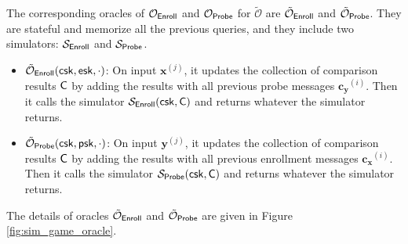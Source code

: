 The corresponding oracles of $\mathcal{O}_{\sf Enroll}$ and $\mathcal{O}_{\sf Probe}$ for $\mathcal{\tilde O}$ are $\tilde{\mathcal{O}}_{\sf Enroll}$ and $\tilde{\mathcal{O}}_{\sf Probe}$. They are stateful and memorize all the previous queries, and they include two simulators: $\mathcal{S}_{\sf Enroll}$ and $\mathcal{S}_{\sf Probe}$.

\begin{itemize}

	\item $\tilde{\mathcal{O}}_{\sf Enroll} ({\sf csk} ,{\sf esk}, \cdot)$: On input $\mathbf{x}^{(j)}$, it updates the collection of comparison results ${\sf C}$ by adding the results with all previous probe messages $\mathbf{c_y}^{(i)}$. Then it calls the simulator $\mathcal{S}_{\sf Enroll}({\sf csk}, {\sf C})$ and returns whatever the simulator returns.

	\item $\tilde{\mathcal{O}}_{\sf Probe} ({\sf csk}, {\sf psk}, \cdot)$: On input $\mathbf{y}^{(j)}$, it updates the collection of comparison results ${\sf C}$ by adding the results with all previous enrollment messages $\mathbf{c_x}^{(i)}$. Then it calls the simulator $\mathcal{S}_{\sf Probe}({\sf csk}, {\sf C})$ and returns whatever the simulator returns.

\end{itemize}

The details of oracles $\tilde{\mathcal{O}}_{\sf Enroll}$ and $\tilde{\mathcal{O}}_{\sf Probe}$ are given in Figure \ref{fig:sim_game_oracle}.

